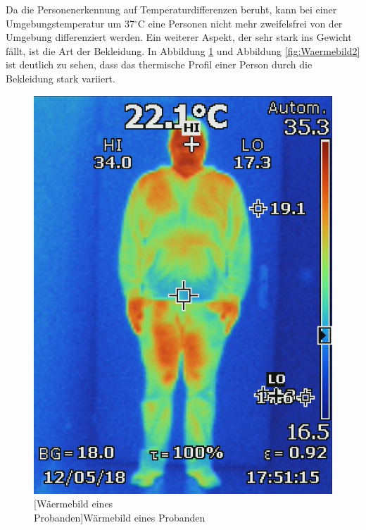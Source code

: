 Da die Personenerkennung auf Temperaturdifferenzen beruht, kann bei einer Umgebungstemperatur um 37$^\circ$C eine Personen nicht mehr zweifelsfrei von der Umgebung differenziert werden.
\newpage
Ein weiterer Aspekt, der sehr stark ins Gewicht fällt, ist die Art der Bekleidung. In Abbildung \ref{fig:Waermebild} und Abbildung \ref{fig:Waermebild2} ist deutlich zu sehen, dass das thermische Profil einer Person durch die Bekleidung stark variiert.
\begin{figure}[!ht]
	\centering
	\begin{minipage}[b]{0.4\linewidth}
		\centering	
		\includegraphics[width=0.8\linewidth]{fig/waermebild1.jpg}
		[Wäermebild eines \\Probanden]{Wärmebild eines Probanden}
		\label{fig:Waermebild}
	\end{minipage}
	\hfill
	\begin{minipage}[b]{0.4\linewidth}
		\centering

\end{minipage}
\end{figure}
